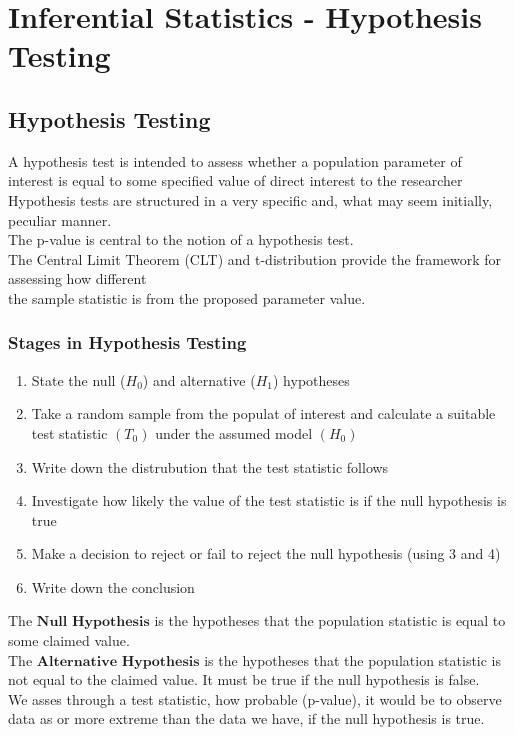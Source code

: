 \documentclass[a4paper, 10pt]{article}
\begin{document}
\section{Inferential Statistics - Hypothesis Testing}
\subsection{Hypothesis Testing}
A hypothesis test is intended to assess whether a population parameter of interest is equal to some
specified value of direct interest to the researcher \\
Hypothesis tests are structured in a very specific and, what may seem initially, peculiar manner. \\
The p-value is central to the notion of a hypothesis test. \\
The Central Limit Theorem (CLT) and t-distribution provide the framework for assessing how different \\
the sample statistic is from the proposed parameter value.

\subsubsection{Stages in Hypothesis Testing}
\begin{enumerate}
    \item State the null ($H_0$) and alternative ($H_1$) hypotheses
    \item Take a random sample from the populat of interest and calculate a suitable test statistic $(T_0)$ under the assumed model $(H_0)$
    \item Write down the distrubution that the test statistic follows
    \item Investigate how likely the value of the test statistic is if the null hypothesis is true
    \item Make a decision to reject or fail to reject the null hypothesis (using 3 and 4)
    \item Write down the conclusion
\end{enumerate}
The $\textbf{Null Hypothesis}$ is the hypotheses that the population statistic is equal to some claimed value.  \\
The $\textbf{Alternative Hypothesis}$ is the hypotheses that the population statistic is not equal to the claimed value. It must be true if the null hypothesis is false. \\
We asses through a test statistic, how probable (p-value), it would be to observe data as or more extreme than the data we have, if the null hypothesis is true. \\
\end{document}
